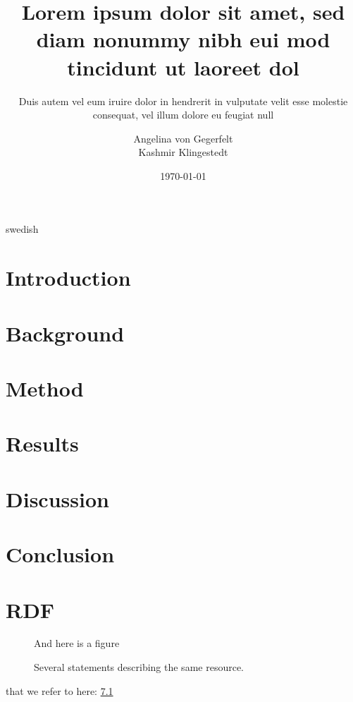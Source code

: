 \documentclass[a4paper,12pt]{kth-mag}
\title{Lorem ipsum dolor sit amet, sed diam nonummy nibh eui
       mod tincidunt ut laoreet dol}
\subtitle{Duis autem vel eum iruire dolor in hendrerit in
          vulputate velit esse molestie consequat, vel illum
          dolore eu feugiat null}
\author{Angelina von Gegerfelt\\Kashmir Klingestedt}
\date{\today}
\begin{document}
\frontmatter
\pagestyle{empty}
\removepagenumbers
\maketitle
{}

\begin{abstract}
\end{abstract}

\begin{foreignabstract}{swedish}
\end{foreignabstract}

\tableofcontents*
\mainmatter
\pagestyle{newchap}

\chapter{Introduction}


\chapter{Background}


\chapter{Method}


\chapter{Results}


\chapter{Discussion}


\chapter{Conclusion}



\newpage
{}


\appendix
\addappheadtotoc
\chapter{RDF}\label{appA}

\begin{figure}[ht]
\begin{center}
And here is a figure
\caption{\small{Several statements describing the same resource.}}\label{RDF_4}
\end{center}
\end{figure}

that we refer to here: \ref{RDF_4}
\end{document}
